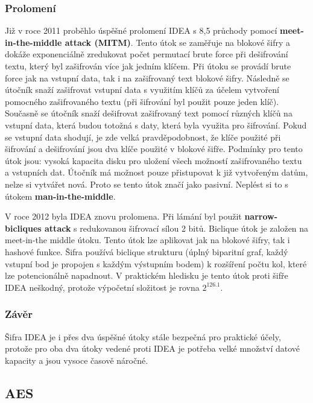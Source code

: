 \documentclass[12pt, a4paper]{article}
\begin{document}
		\subsubsection{Prolomení}
		Již v roce 2011 proběhlo úspěšné prolomení IDEA s 8,5 průchody pomocí \textbf{meet-in-the-middle attack (MITM)}. Tento útok se zaměřuje na blokové šifry a dokáže exponenciálně zredukovat počet permutací  brute force při dešifrování textu, který byl zašifrován více jak jedním klíčem. Při útoku se provádí brute force jak na vstupní data, tak i na zašifrovaný text blokové šifry. Následně se útočník snaží zašifrovat vstupní data s využitím klíčů za účelem vytvoření pomocného zašifrovaného textu (při šifrování byl použit pouze jeden klíč). Současně se útočník snaží dešifrovat zašifrovaný text pomocí různých klíčů na vstupní data, která budou totožná s daty, která byla využita pro šifrování. Pokud se vstupní data shodují, je zde velká pravděpodobnost, že klíče použité při šifrování a dešifrování jsou dva klíče použité v blokové šifře. Podmínky pro tento útok jsou: vysoká kapacita disku pro uložení všech možností zašifrovaného textu a vstupních dat. Útočník má možnost pouze přistupovat k již vytvořeným datům, nelze si vytvářet nová. Proto se tento útok značí jako pasivní. Neplést si to s útokem \textbf{man-in-the-middle}.
		\par
		V roce 2012 byla IDEA znovu prolomena. Při lámání byl použit \textbf{narrow-bicliques attack} s redukovanou šifrovací sílou 2 bitů. Biclique útok je založen na meet-in-the middle útoku. Tento útok lze aplikovat jak na blokové šifry, tak i hashové funkce. Šifra používá biclique strukturu (úplný biparitní graf, každý vstupní bod je propojen s každým výstupním bodem) k rozšíření počtu kol, které lze potencionálně napadnout. V praktickém hledisku je tento útok proti šifře IDEA neškodný, protože výpočetní složitost je rovna $2^{126.1}$.
		\subsubsection{Závěr}
		Šifra IDEA je i přes dva úspěšné útoky stále bezpečná pro praktické účely, protože pro oba dva útoky vedené proti IDEA je potřeba velké množství datové kapacity a jsou vysoce časově náročné. 
	\subsection{AES}
	\label{subsec:aes}
\end{document}
